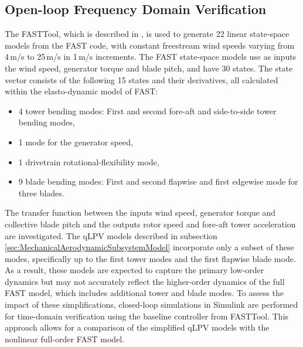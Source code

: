 {\subsection{Open-loop Frequency Domain Verification}
The FASTTool, which is described in \cite{mulders2020wind}, is used to generate 22 linear state-space models from the FAST code, with constant freestream wind speeds varying from 4\,m/s to 25\,m/s in 1\,m/s increments. The FAST state-space models use as inputs the wind speed, generator torque and blade pitch, and have 30 states. %
The state vector consists of the following 15 states and their derivatives, all calculated within the elasto-dynamic model of FAST:
\begin{itemize}
    \item 4 tower bending modes: First and second fore-aft and side-to-side tower bending modes,
    \item 1 mode for the generator speed,
    \item 1 drivetrain rotational-flexibility mode,
    \item 9 blade bending modes: First and second flapwise and first edgewise mode for three blades.
\end{itemize}
The transfer function between the inputs wind speed, generator torque and collective blade pitch and the outputs rotor speed and fore-aft tower acceleration are investigated. The qLPV models described in subsection \ref{sec:MechanicalAerodynamicSubsystemModel} incorporate only a subset of these modes, specifically up to the first tower modes and the first flapwise blade mode. As a result, these models are expected to capture the primary low-order dynamics but may not accurately reflect the higher-order dynamics of the full FAST model, which includes additional tower and blade modes. To assess the impact of these simplifications, closed-loop simulations in Simulink are performed for time-domain verification using the baseline controller from FASTTool. This approach allows for a comparison of the simplified qLPV models with the nonlinear full-order FAST model.
%
}
